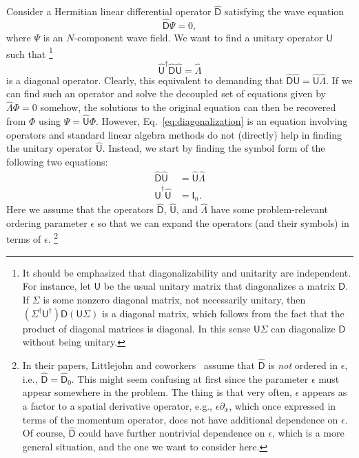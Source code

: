 Consider a Hermitian linear differential operator $\widehat{\mathsf{D}}$ satisfying the wave equation
%
\begin{equation}
  \widehat{\mathsf{D}}\Psi = 0,
\end{equation}
%
where $\Psi$ is an $N$-component wave field.
%
We want to find a unitary operator ${\mathsf{U}}$ such that%
\footnote{It should be emphasized that diagonalizability and unitarity are independent. For instance, let $\mathsf{U}$ be the usual unitary matrix that diagonalizes a matrix $\mathsf{D}$.
  If $\Sigma$ is some nonzero diagonal matrix, not necessarily unitary, then $(\Sigma^{\dagger}\mathsf{U}^{\dagger})\mathsf{D}(\mathsf{U}\Sigma)$ is a diagonal matrix, which follows from the fact that the product of diagonal matrices is diagonal.
  In this sense $\mathsf{U}\Sigma$ can diagonalize $\mathsf{D}$ without being unitary.}
%
\begin{equation}
  \widehat{\mathsf{U}}^{\dagger}\widehat{\mathsf{D}}\widehat{\mathsf{U}} = \widehat{\Lambda}\label{eq:diagonalization}
\end{equation}
%
is a diagonal operator.
Clearly, this equivalent to demanding that $\widehat{\mathsf{D}}\widehat{\mathsf{U}} = \widehat{\mathsf{U}}\widehat{\Lambda}$.
If we can find such an operator and solve the decoupled set of equations given by $\widehat{\Lambda}\Phi = 0$ somehow,
the solutions to the original equation can then be recovered from $\Phi$ using $\Psi = \widehat{\mathsf{U}}\Phi$.
However, Eq.~\eqref{eq:diagonalization} is an equation involving operators and standard linear algebra methods do not (directly) help in finding the unitary operator $\widehat{\mathsf{U}}$.
Instead, we start by finding the symbol form of the following two equations:
%
\begin{equation}
  \begin{aligned}
    \widehat{\mathsf{D}}\widehat{\mathsf{U}} &= \widehat{\mathsf{U}}\widehat{\Lambda}\\
    \widehat{\mathsf{U}}^{\dagger}\widehat{\mathsf{U}} &= \mathsf{I}_{n}.
  \end{aligned}
  \label{eq:diagonal2}
\end{equation}
%
Here we assume that the operators $\widehat{\mathsf{D}}$, $\widehat{\mathsf{U}}$, and $\widehat{\Lambda}$ have some problem-relevant ordering parameter $\epsilon$ so that we can expand the operators (and their symbols) in terms of $\epsilon$.%
\footnote{In their papers, Littlejohn and coworkers~\cite{littlejohn1991,weigert1993} assume that $\widehat{\mathsf{D}}$ is \emph{not} ordered in $\epsilon$, i.e., $\widehat{\mathsf{D}} = \widehat{\mathsf{D}}_{0}$.
  This might seem confusing at first since the parameter $\epsilon$ must appear somewhere in the problem.
  The thing is that very often, $\epsilon$ appears as a factor to a spatial derivative operator, e.g., $\epsilon\partial_{x}$, which once expressed in terms of the momentum operator, does not have additional dependence on $\epsilon$.
  Of course, $\widehat{\mathsf{D}}$ could have further nontrivial dependence on $\epsilon$, which is a more general situation, and the one we want to consider here.
}
